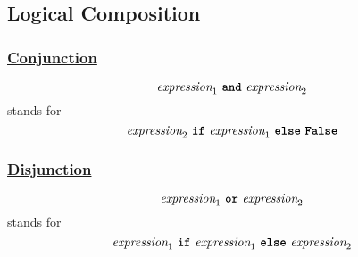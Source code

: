 \subsection*{Logical Composition}

\subsubsection*{\href{https://sourceacademy.org/sicpjs/1.1.6\#p4}{Conjunction}}

\[
\textit{expression}_1 \ \textbf{\texttt{and}} \ \textit{expression}_2
\]
stands for
\[
\textit{expression}_2 \ \textbf{\texttt{if}} \ \textit{expression}_1 \ \textbf{\texttt{else}} \ \textbf{\texttt{False}}
\]

\subsubsection*{\href{https://sourceacademy.org/sicpjs/1.1.6\#p4}{Disjunction}}

\[
\textit{expression}_1 \ \textbf{\texttt{or}} \ \textit{expression}_2
\]
stands for
\[
\textit{expression}_1 \ \textbf{\texttt{if}} \ \textit{expression}_1 \ \textbf{\texttt{else}} \ \textit{expression}_2
\]




